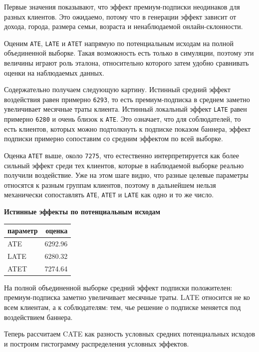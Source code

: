 \documentclass[11pt]{article}
\newcounter{none}
\begin{document}
    Первые значения показывают, что эффект премиум-подписки неодинаков для
разных клиентов. Это ожидаемо, потому что в генерации эффект зависит от
дохода, города, размера семьи, возраста и ненаблюдаемой
онлайн-склонности.

    Оценим \texttt{ATE}, \texttt{LATE} и \texttt{ATET} напрямую по
потенциальным исходам на полной объединенной выборке. Такая возможность
есть только в симуляции, поэтому эти величины играют роль эталона,
относительно которого затем удобно сравнивать оценки на наблюдаемых
данных.

Содержательно получаем следующую картину. Истинный средний эффект
воздействия равен примерно \texttt{6293}, то есть премиум-подписка в
среднем заметно увеличивает месячные траты клиента. Истинный локальный
эффект \texttt{LATE} равен примерно \texttt{6280} и очень близок к
\texttt{ATE}. Это означает, что для соблюдателей, то есть клиентов,
которых можно подтолкнуть к подписке показом баннера, эффект подписки
примерно сопоставим со средним эффектом по всей выборке.

Оценка \texttt{ATET} выше, около \texttt{7275}, что естественно
интерпретируется как более сильный эффект среди тех клиентов, которые в
наблюдаемой выборке реально получили воздействие. Уже на этом шаге
видно, что разные целевые параметры относятся к разным группам клиентов,
поэтому в дальнейшем нельзя механически сопоставлять \texttt{ATE},
\texttt{ATET} и \texttt{LATE} как одно и то же число.

    \textbf{Истинные эффекты по потенциальным исходам}

{\def\LTcaptype{none} %
\begin{longtable}[]{@{}lr@{}}
\toprule\noalign{}
параметр & оценка \\
\midrule\noalign{}
\endhead
\bottomrule\noalign{}
\endlastfoot
ATE & 6292.96 \\
LATE & 6280.32 \\
ATET & 7274.64 \\
\end{longtable}
}

    На полной объединенной выборке средний эффект подписки положителен:
премиум-подписка заметно увеличивает месячные траты. LATE относится не
ко всем клиентам, а к соблюдателям: тем, чье решение о подписке меняется
под воздействием баннера.

    Теперь рассчитаем CATE как разность условных средних потенциальных
исходов и построим гистограмму распределения условных эффектов.
\end{document}
